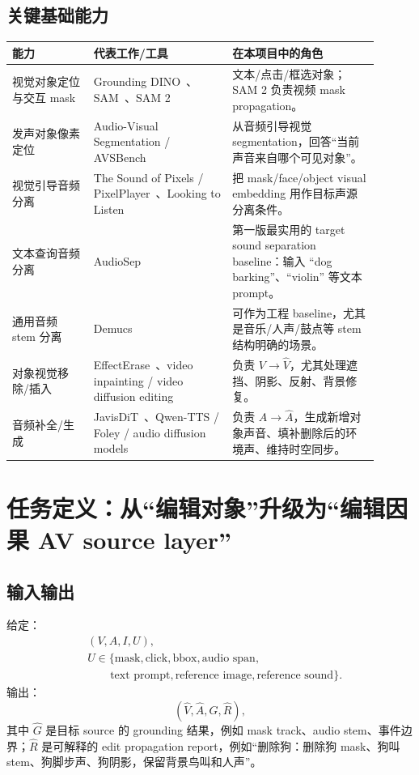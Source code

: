 \subsection{关键基础能力}

\begin{longtable}{p{0.20\linewidth}p{0.34\linewidth}p{0.36\linewidth}}
\toprule
\textbf{能力} & \textbf{代表工作/工具} & \textbf{在本项目中的角色} \\
\midrule
视觉对象定位与交互 mask & Grounding DINO~\cite{groundingdino2023}、SAM~\cite{sam2023}、SAM 2~\cite{sam22024} & 文本/点击/框选对象；SAM 2 负责视频 mask propagation。 \\
\midrule
发声对象像素定位 & Audio-Visual Segmentation / AVSBench~\cite{avs2022} & 从音频引导视觉 segmentation，回答“当前声音来自哪个可见对象”。 \\
\midrule
视觉引导音频分离 & The Sound of Pixels / PixelPlayer~\cite{soundofpixels2018}、Looking to Listen~\cite{lookingtolistenn2018} & 把 mask/face/object visual embedding 用作目标声源分离条件。 \\
\midrule
文本查询音频分离 & AudioSep~\cite{audiosep2023} & 第一版最实用的 target sound separation baseline：输入 ``dog barking''、``violin'' 等文本 prompt。 \\
\midrule
通用音频 stem 分离 & Demucs~\cite{demucs2019} & 可作为工程 baseline，尤其是音乐/人声/鼓点等 stem 结构明确的场景。 \\
\midrule
对象视觉移除/插入 & EffectErase~\cite{effecterase2026}、video inpainting / video diffusion editing & 负责 $V \rightarrow \hat V$，尤其处理遮挡、阴影、反射、背景修复。 \\
\midrule
音频补全/生成 & JavisDiT~\cite{javisdit2026}、Qwen-TTS / Foley / audio diffusion models & 负责 $A \rightarrow \hat A$，生成新增对象声音、填补删除后的环境声、维持时空同步。 \\
\bottomrule
\end{longtable}

\section{任务定义：从“编辑对象”升级为“编辑因果 AV source layer”}

\subsection{输入输出}

给定：
\[
\begin{aligned}
&(V, A, I, U),\\
&U \in \{\text{mask}, \text{click}, \text{bbox}, \text{audio span},\\
&\qquad \text{text prompt}, \text{reference image}, \text{reference sound}\}.
\end{aligned}
\]
输出：
\[
(\hat V, \hat A, \hat G, \hat R),
\]
其中 $\hat G$ 是目标 source 的 grounding 结果，例如 mask track、audio stem、事件边界；$\hat R$ 是可解释的 edit propagation report，例如“删除狗：删除狗 mask、狗叫 stem、狗脚步声、狗阴影，保留背景鸟叫和人声”。


